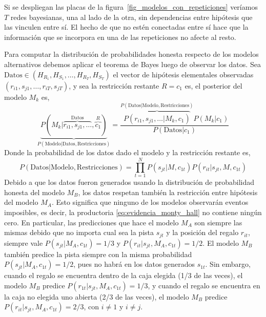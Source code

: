 \documentclass[a4paper,11pt]{book}
\theoremstyle{definition}
\begin{document}
%
Si se despliegan las placas de la figura~\ref{fig_modelos_con_repeticiones} ver\'iamos $T$ redes bayesianas, una al lado de la otra, sin dependencias entre hip\'otesis que las vinculen entre s\'i.
%
El hecho de que no est\'en conectadas entre s\'i hace que la informaci\'on que se incorpora en una de las repeticiones no afecte al resto.


Para computar la distribuci\'on de probabilidades honesta respecto de los modelos alternativos debemos aplicar el teorema de Bayes luego de observar los datos.
%
Sea $\text{Datos}\in (H_{R_1}, H_{S_1}, \dots, H_{R_T}, H_{S_T})$ el vector de hip\'otesis elementales observadas $(r_{i1}, s_{j1}, \dots, r_{iT}, s_{jT})$, y sea la restricci\'on restante $R=c_1$ es, el posterior del modelo $M_k$ es,
%
\begin{equation}\label{eq:posterior_modelo_montyhall}
\underbrace{P(M_k|\overbrace{r_{i1},s_{j1}, \dots }^{\text{Datos}},\overbrace{c_1}^{R})}_{P(\text{Modelo}|\text{Datos},\text{Restricciones})} = \frac{\overbrace{P(r_{i1},s_{j1}, \dots |M_k,c_1)}^{P(\text{Datos}|\text{Modelo},\text{Restricciones})} P(M_k|c_1)}{P(\text{Datos}|c_1)}
\end{equation}
%
Donde la probabilidad de los datos dado el modelo y la restricci\'on restante es,
%
\begin{equation} \label{eq:evidencia_monty_hall}
P(\text{Datos}|\text{Modelo},\text{Restricciones}) = \prod_{t=1}^N P(s_{jt}|M,c_{1t})P(r_{it}|s_{jt},M,c_{1t})
\end{equation}
%
Debido a que los datos fueron generados usando la distribuci\'on de probabilidad honesta del modelo $M_B$, los datos respetan tambi\'en la restricci\'on entre hip\'otesis del modelo $M_A$.
%
Esto significa que ninguno de los modelos observar\'an eventos imposibles, es decir, la productoria \eqref{eq:evidencia_monty_hall} no contiene ning\'un cero.
%
En particular, las predicciones que hace el modelo $M_A$ son siempre las mismas debido que no importa cual sea la pista $s_{jt}$ y la posici\'on del regalo $r_{it}$, siempre vale $P(s_{jt}|M_A,c_{1t}) = 1/3$ y $P(r_{it}|s_{jt},M_A,c_{1t}) = 1/2$.
%
El modelo $M_B$ tambi\'en predice la pista siempre con la misma probabilidad $P(s_{jt}|M_A,c_{1t})=1/2$, pues no habr\'a en los datos generados $s_{1t}$.
%
Sin embargo, cuando el regalo se encuentra dentro de la caja elegida (1/3 de las veces), el modelo $M_B$ predice $P(r_{1t}|s_{jt},M_A,c_{1t}) = 1/3$, y cuando el regalo se encuentra en la caja no elegida uno abierta (2/3 de las veces), el modelo $M_B$ predice $P(r_{it}|s_{jt},M_A,c_{1t}) = 2/3$, con $i\neq1$ y $i\neq j$.
\end{document}
